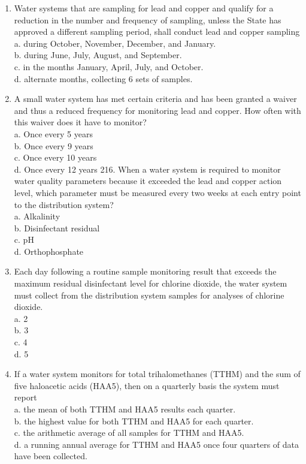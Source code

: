 \documentclass[10pt]{article}
\begin{document}
\begin{enumerate}
  \item Water systems that are sampling for lead and copper and qualify for a reduction in the number and frequency of sampling, unless the State has approved a different sampling period, shall conduct lead and copper sampling\\
a. during October, November, December, and January.\\
b. during June, July, August, and September.\\
c. in the months January, April, July, and October.\\
d. alternate months, collecting 6 sets of samples.

  \item A small water system has met certain criteria and has been granted a waiver and thus a reduced frequency for monitoring lead and copper. How often with this waiver does it have to monitor?\\
a. Once every 5 years\\
b. Once every 9 years\\
c. Once every 10 years\\
d. Once every 12 years 216. When a water system is required to monitor water quality parameters because it exceeded the lead and copper action level, which parameter must be measured every two weeks at each entry point to the distribution system?\\
a. Alkalinity\\
b. Disinfectant residual\\
c. $\mathrm{pH}$\\
d. Orthophosphate

  \item Each day following a routine sample monitoring result that exceeds the maximum residual disinfectant level for chlorine dioxide, the water system must collect from the distribution system samples for analyses of chlorine dioxide.\\
a. 2\\
b. 3\\
c. 4\\
d. 5

  \item If a water system monitors for total trihalomethanes (TTHM) and the sum of five haloacetic acids (HAA5), then on a quarterly basis the system must report\\
a. the mean of both TTHM and HAA5 results each quarter.\\
b. the highest value for both TTHM and HAA5 for each quarter.\\
c. the arithmetic average of all samples for TTHM and HAA5.\\
d. a running annual average for TTHM and HAA5 once four quarters of data have been collected.


\end{enumerate}
\end{document}
